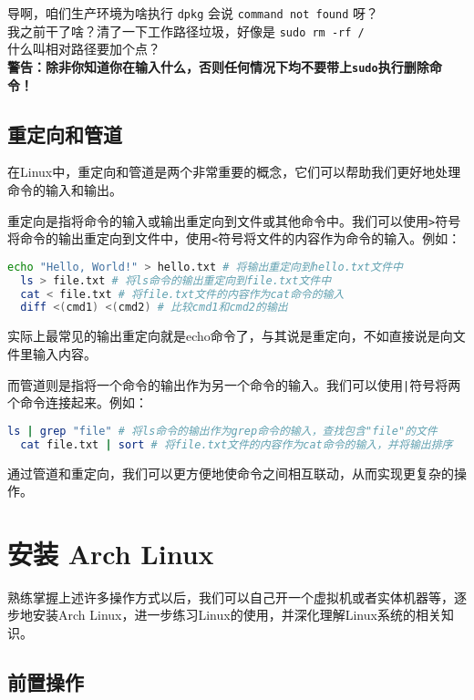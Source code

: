 \documentclass[../main.tex]{subfiles}
\begin{document}
\begin{warning}
  导啊，咱们生产环境为啥执行 \texttt{dpkg} 会说 \texttt{command not found} 呀？\\
  我之前干了啥？清了一下工作路径垃圾，好像是 \texttt{sudo rm -rf /}\\
  什么叫相对路径要加个点？\\
  {\color{red}\textbf{警告：除非你知道你在输入什么，否则任何情况下均不要带上\texttt{sudo}执行删除命令！}}
\end{warning}

\subsection{重定向和管道}

在Linux中，重定向和管道是两个非常重要的概念，它们可以帮助我们更好地处理命令的输入和输出。

重定向是指将命令的输入或输出重定向到文件或其他命令中。我们可以使用\texttt{>}符号将命令的输出重定向到文件中，使用\texttt{<}符号将文件的内容作为命令的输入。例如：
\begin{lstlisting}[language=bash]
  echo "Hello, World!" > hello.txt # 将输出重定向到hello.txt文件中
  ls > file.txt # 将ls命令的输出重定向到file.txt文件中
  cat < file.txt # 将file.txt文件的内容作为cat命令的输入
  diff <(cmd1) <(cmd2) # 比较cmd1和cmd2的输出
\end{lstlisting}
实际上最常见的输出重定向就是echo命令了，与其说是重定向，不如直接说是向文件里输入内容。

而管道则是指将一个命令的输出作为另一个命令的输入。我们可以使用\texttt{|}符号将两个命令连接起来。例如：
\begin{lstlisting}[language=bash]
  ls | grep "file" # 将ls命令的输出作为grep命令的输入，查找包含"file"的文件
  cat file.txt | sort # 将file.txt文件的内容作为cat命令的输入，并将输出排序
\end{lstlisting}

通过管道和重定向，我们可以更方便地使命令之间相互联动，从而实现更复杂的操作。

\section{安装 Arch Linux}

熟练掌握上述许多操作方式以后，我们可以自己开一个虚拟机或者实体机器等，逐步地安装Arch Linux，进一步练习Linux的使用，并深化理解Linux系统的相关知识。

\subsection{前置操作}
\end{document}
